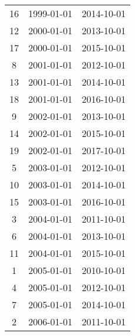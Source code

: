 % 
\begin{tabular}{ccc}
  \hline
  \hline
16 & 1999-01-01 & 2014-10-01 \\ 
  12 & 2000-01-01 & 2013-10-01 \\ 
  17 & 2000-01-01 & 2015-10-01 \\ 
  8 & 2001-01-01 & 2012-10-01 \\ 
  13 & 2001-01-01 & 2014-10-01 \\ 
  18 & 2001-01-01 & 2016-10-01 \\ 
  9 & 2002-01-01 & 2013-10-01 \\ 
  14 & 2002-01-01 & 2015-10-01 \\ 
  19 & 2002-01-01 & 2017-10-01 \\ 
  5 & 2003-01-01 & 2012-10-01 \\ 
  10 & 2003-01-01 & 2014-10-01 \\ 
  15 & 2003-01-01 & 2016-10-01 \\ 
  3 & 2004-01-01 & 2011-10-01 \\ 
  6 & 2004-01-01 & 2013-10-01 \\ 
  11 & 2004-01-01 & 2015-10-01 \\ 
  1 & 2005-01-01 & 2010-10-01 \\ 
  4 & 2005-01-01 & 2012-10-01 \\ 
  7 & 2005-01-01 & 2014-10-01 \\ 
  2 & 2006-01-01 & 2011-10-01 \\ 
   \hline
\end{tabular}

